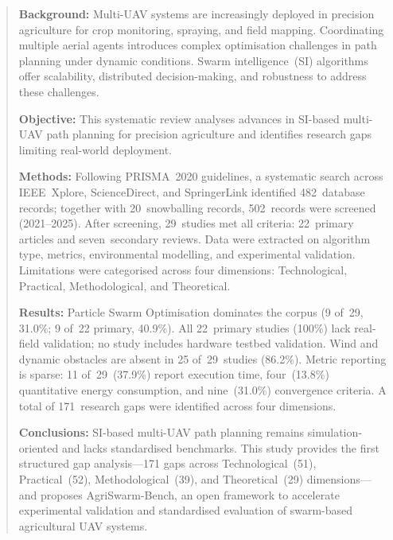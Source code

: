 \documentclass[review,3p]{elsarticle}
\begin{document}
\begin{frontmatter}
\address[1]{Instituto Tecnológico de Chihuahua II, Tecnológico Nacional de México, Chihuahua, México}
\address[2]{Universidad Politécnica de Chihuahua, Chihuahua, México}
\address[3]{Facultad de Ingeniería, Universidad Autónoma de Chihuahua, Chihuahua, México}
\address[4]{Departamento de Ingeniería Mecánica, Universidad de Zaragoza, Zaragoza, España}


\begin{abstract}
\textbf{Background:} Multi-UAV systems are increasingly deployed in precision
agriculture for crop monitoring, spraying, and field mapping. Coordinating
multiple aerial agents introduces complex optimisation challenges in path
planning under dynamic conditions. Swarm intelligence~(SI) algorithms offer
scalability, distributed decision-making, and robustness to address these
challenges.

\textbf{Objective:} This systematic review analyses advances in SI-based
multi-UAV path planning for precision agriculture and identifies research gaps
limiting real-world deployment.

\textbf{Methods:} Following PRISMA~2020 guidelines, a systematic search across
IEEE~Xplore, ScienceDirect, and SpringerLink identified 482~database records;
together with 20~snowballing records, 502~records were screened (2021--2025).
After screening, 29~studies met all criteria: 22~primary articles and
seven~secondary reviews. Data were extracted on algorithm type, metrics,
environmental modelling, and experimental validation. Limitations were
categorised across four dimensions: Technological, Practical, Methodological,
and Theoretical.

\textbf{Results:} Particle Swarm Optimisation dominates the corpus
(9 of~29, 31.0\%; 9 of~22 primary, 40.9\%). All 22~primary studies
(100\%) lack real-field validation; no study includes hardware testbed
validation. Wind and dynamic obstacles are absent in 25 of~29~studies
(86.2\%). Metric reporting is sparse: 11 of~29~(37.9\%) report execution
time, four~(13.8\%) quantitative energy consumption, and nine~(31.0\%)
convergence criteria. A total of 171~research gaps were identified across
four dimensions.

\textbf{Conclusions:} SI-based multi-UAV path planning remains
simulation-oriented and lacks standardised benchmarks. This study provides
the first structured gap analysis---171 gaps across Technological~(51),
Practical~(52), Methodological~(39), and Theoretical~(29)
dimensions---and proposes AgriSwarm-Bench, an open framework to accelerate
experimental validation and standardised evaluation of swarm-based
agricultural UAV systems.
\end{abstract}


\end{frontmatter}
\end{document}
